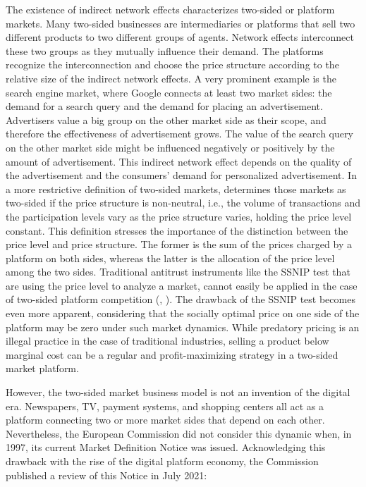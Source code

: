 \documentclass[12pt,a4paper,notitlepage]{article}
\begin{document}
The existence of indirect network effects characterizes two-sided or platform markets. Many two-sided businesses are intermediaries or platforms that sell two different products to two different groups of agents. Network effects interconnect these two groups as they mutually influence their demand. The platforms recognize the interconnection and choose the price structure according to the relative size of the indirect network effects. A very prominent example is the search engine market, where Google connects at least two market sides: the demand for a search query and the demand for placing an advertisement. Advertisers value a big group on the other market side as their scope, and therefore the effectiveness of advertisement grows. The value of the search query on the other market side might be influenced negatively or positively by the amount of advertisement. This indirect network effect depends on the quality of the advertisement and the consumers' demand for personalized advertisement. In a more restrictive definition of two-sided markets, \citet{rochet_platform_2003} determines those markets as two-sided if the price structure is non-neutral, i.e., the volume of transactions and the participation levels vary as the price structure varies, holding the price level constant. This definition stresses the importance of the distinction between the price level and price structure. The former is the sum of the prices charged by a platform on both sides, whereas the latter is the allocation of the price level among the two sides. Traditional antitrust instruments like the SSNIP test that are using the price level to analyze a market, cannot easily be applied in the case of two-sided platform competition (\citet{noel_analyzing_2005}, \citet{filistrucchi_market_2013}). The drawback of the SSNIP test becomes even more apparent, considering that the socially optimal price on one side of the platform may be zero under such market dynamics. While predatory pricing is an illegal practice in the case of traditional industries, selling a product below marginal cost can be a regular and profit-maximizing strategy in a two-sided market platform. 

However, the two-sided market business model is not an invention of the digital era. Newspapers, TV, payment systems, and shopping centers all act as a platform connecting two or more market sides that depend on each other. Nevertheless, the European Commission did not consider this dynamic when, in 1997, its current Market Definition Notice was issued. Acknowledging this drawback with the rise of the digital platform economy, the Commission published a review of this Notice in July 2021:
\end{document}

